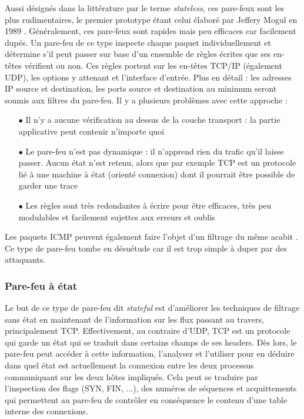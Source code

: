 \documentclass[]{article}
\begin{document}
Aussi désignés dans la littérature par le terme \textit{stateless}, ces pare-feux sont les plus rudimentaires, le premier prototype étant celui élaboré par Jeffery Mogul en 1989 \cite{Shieha2014}. Généralement, ces pare-feux sont rapides mais peu efficaces car facilement dupés. Un pare-feu de ce type inspecte chaque paquet individuellement et détermine s'il peut passer sur base d'un ensemble de règles écrites que ses en-têtes vérifient ou non. Ces règles portent sur les en-têtes TCP/IP (également UDP), les options y attenant et l'interface d'entrée. Plus en détail : les adresses IP source et destination, les ports source et destination au minimum seront soumis aux filtres du pare-feu. Il y a plusieurs problèmes avec cette approche :
\vspace{0.2cm}
\begin{itemize}
\item[$\bullet$] Il n'y a aucune vérification au dessus de la couche transport : la partie applicative peut contenir n'importe quoi
\vspace{0.2cm}
\item[$\bullet$] Le pare-feu n'est pas dynamique : il n'apprend rien du trafic qu'il laisse passer. Aucun état n'est retenu, alors que par exemple TCP est un protocole lié à une machine à état (orienté connexion) dont il pourrait être possible de garder une trace
\vspace{0.2cm}
\item[$\bullet$] Les règles sont très redondantes à écrire pour être efficaces, très peu modulables et facilement sujettes aux erreurs et oublis
\end{itemize}
\vspace{0.25cm}

Les paquets ICMP peuvent également faire l'objet d'un filtrage du même acabit \cite{Shimonski2013}.
Ce type de pare-feu tombe en désuétude car il est trop simple à duper par des attaquants.  


\newpage

\subsubsection{Pare-feu à état}

Le but de ce type de pare-feu dit \textit{stateful} est d'améliorer les techniques de filtrage sans état en maintenant de l'information sur les flux passant au travers, principalement TCP. Effectivement, au contraire d'UDP, TCP est un protocole qui garde un état qui se traduit dans certains champs de ses headers. Dès lors, le pare-feu peut accéder à cette information, l'analyser et l'utiliser pour en déduire dans quel état est actuellement la connexion entre les deux processus communiquant sur les deux hôtes impliqués. Cela peut se traduire par l'inspection des flags (SYN, FIN, ...), des numéros de séquences et acquittements qui permettent au pare-feu de contrôler en conséquence le contenu d'une table interne des connexions.\\ 
\end{document}
